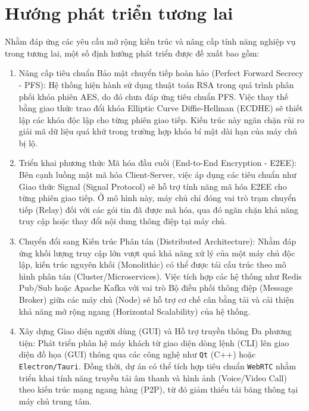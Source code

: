 \section{Hướng phát triển tương lai}

Nhằm đáp ứng các yêu cầu mở rộng kiến trúc và nâng cấp tính năng nghiệp vụ trong tương lai, một số định hướng phát triển được đề xuất bao gồm:

\begin{enumerate}[label=\arabic*.]
    \item Nâng cấp tiêu chuẩn Bảo mật chuyển tiếp hoàn hảo (Perfect Forward Secrecy - PFS):
    Hệ thống hiện hành sử dụng thuật toán RSA trong quá trình phân phối khóa phiên AES, do đó chưa đáp ứng tiêu chuẩn PFS. Việc thay thế bằng giao thức trao đổi khóa Elliptic Curve Diffie-Hellman (ECDHE) sẽ thiết lập các khóa độc lập cho từng phiên giao tiếp. Kiến trúc này ngăn chặn rủi ro giải mã dữ liệu quá khứ trong trường hợp khóa bí mật dài hạn của máy chủ bị lộ.

    \item Triển khai phương thức Mã hóa đầu cuối (End-to-End Encryption - E2EE):
    Bên cạnh luồng mật mã hóa Client-Server, việc áp dụng các tiêu chuẩn như Giao thức Signal (Signal Protocol) sẽ hỗ trợ tính năng mã hóa E2EE cho từng phiên giao tiếp. Ở mô hình này, máy chủ chỉ đóng vai trò trạm chuyển tiếp (Relay) đối với các gói tin đã được mã hóa, qua đó ngăn chặn khả năng truy cập hoặc thay đổi nội dung thông điệp tại máy chủ.

    \item Chuyển đổi sang Kiến trúc Phân tán (Distributed Architecture):
    Nhằm đáp ứng khối lượng truy cập lớn vượt quá khả năng xử lý của một máy chủ độc lập, kiến trúc nguyên khối (Monolithic) có thể được tái cấu trúc theo mô hình phân tán (Cluster/Microservices). Việc tích hợp các hệ thống như Redis Pub/Sub hoặc Apache Kafka với vai trò Bộ điều phối thông điệp (Message Broker) giữa các máy chủ (Node) sẽ hỗ trợ cơ chế cân bằng tải và cải thiện khả năng mở rộng ngang (Horizontal Scalability) của hệ thống.

    \item Xây dựng Giao diện người dùng (GUI) và Hỗ trợ truyền thông Đa phương tiện:
    Phát triển phân hệ máy khách từ giao diện dòng lệnh (CLI) lên giao diện đồ họa (GUI) thông qua các công nghệ như \texttt{Qt} (C++) hoặc \texttt{Electron/Tauri}. Đồng thời, dự án có thể tích hợp tiêu chuẩn \texttt{WebRTC} nhằm triển khai tính năng truyền tải âm thanh và hình ảnh (Voice/Video Call) theo kiến trúc mạng ngang hàng (P2P), từ đó giảm thiểu tải băng thông tại máy chủ trung tâm.
\end{enumerate}
